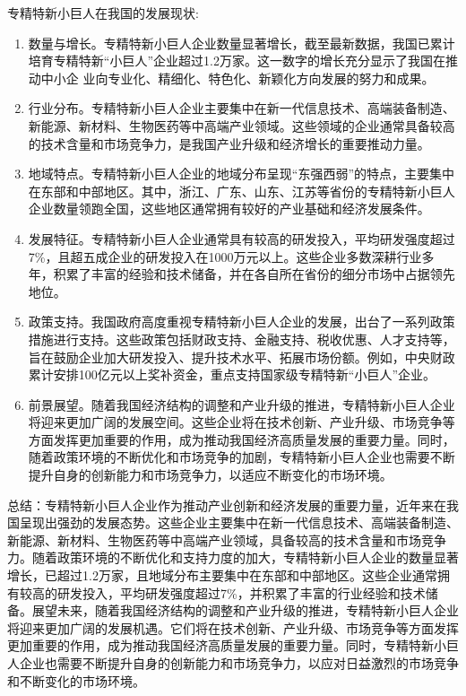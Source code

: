\documentclass{article}
\begin{document}
专精特新小巨人在我国的发展现状:
\begin{enumerate}
    \item 数量与增长。专精特新小巨人企业数量显著增长，截至最新数据，我国已累计培育专精特新“小巨人”企业超过1.2万家。这一数字的增长充分显示了我国在推动中小企 业向专业化、精细化、特色化、新颖化方向发展的努力和成果。
    \item 行业分布。专精特新小巨人企业主要集中在新一代信息技术、高端装备制造、新能源、新材料、生物医药等中高端产业领域。这些领域的企业通常具备较高的技术含量和市场竞争力，是我国产业升级和经济增长的重要推动力量。
    \item 地域特点。专精特新小巨人企业的地域分布呈现“东强西弱”的特点，主要集中在东部和中部地区。其中，浙江、广东、山东、江苏等省份的专精特新小巨人企业数量领跑全国，这些地区通常拥有较好的产业基础和经济发展条件。
    \item 发展特征。专精特新小巨人企业通常具有较高的研发投入，平均研发强度超过7\%，且超五成企业的研发投入在1000万元以上。这些企业多数深耕行业多年，积累了丰富的经验和技术储备，并在各自所在省份的细分市场中占据领先地位。
    \item 政策支持。我国政府高度重视专精特新小巨人企业的发展，出台了一系列政策措施进行支持。这些政策包括财政支持、金融支持、税收优惠、人才支持等，旨在鼓励企业加大研发投入、提升技术水平、拓展市场份额。例如，中央财政累计安排100亿元以上奖补资金，重点支持国家级专精特新“小巨人”企业。
    \item 前景展望。随着我国经济结构的调整和产业升级的推进，专精特新小巨人企业将迎来更加广阔的发展空间。这些企业将在技术创新、产业升级、市场竞争等方面发挥更加重要的作用，成为推动我国经济高质量发展的重要力量。同时，随着政策环境的不断优化和市场竞争的加剧，专精特新小巨人企业也需要不断提升自身的创新能力和市场竞争力，以适应不断变化的市场环境。
\end{enumerate} 

总结：专精特新小巨人企业作为推动产业创新和经济发展的重要力量，近年来在我国呈现出强劲的发展态势。这些企业主要集中在新一代信息技术、高端装备制造、新能源、新材料、生物医药等中高端产业领域，具备较高的技术含量和市场竞争力。随着政策环境的不断优化和支持力度的加大，专精特新小巨人企业的数量显著增长，已超过1.2万家，且地域分布主要集中在东部和中部地区。这些企业通常拥有较高的研发投入，平均研发强度超过7\%，并积累了丰富的行业经验和技术储备。展望未来，随着我国经济结构的调整和产业升级的推进，专精特新小巨人企业将迎来更加广阔的发展机遇。它们将在技术创新、产业升级、市场竞争等方面发挥更加重要的作用，成为推动我国经济高质量发展的重要力量。同时，专精特新小巨人企业也需要不断提升自身的创新能力和市场竞争力，以应对日益激烈的市场竞争和不断变化的市场环境。
\end{document}
